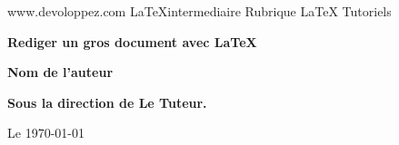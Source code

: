 \begin{titlepage}
\parindent=0pt
www.devoloppez.com  \LaTeX intermediaire%
Rubrique \LaTeX{} Tutoriels
\hrulefill
\begin{center}\bfseries\Huge
    Rediger un gros document avec \LaTeX
\end{center}
\hrulefill
\vspace*{1cm}
\begin{center}\bfseries\Large
Nom de l'auteur
\end{center}
    
\begin{center}\bfseries\Large
Sous la direction de Le Tuteur.
\end{center}
\begin{flushright}
       Le \today 
\end{flushright}   
\end{titlepage}